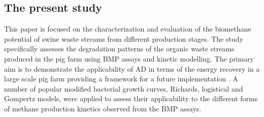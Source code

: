 \subsection{The present study}
This paper is focused on the characterization and evaluation of the biomethane potential of swine waste streams from different production stages. The study specifically assesses the degradation patterns of the organic waste streams produced in the pig farm using BMP assays and kinetic modelling. The primary aim is to demonstrate the applicability of AD in terms of the energy recovery in a large scale pig farm providing a framework for a future implementation  . A number of popular modified bacterial growth curves, Richards, logistical and Gompertz models, were applied to assess their applicability to the different forms of methane production kinetics observed from the BMP assays.